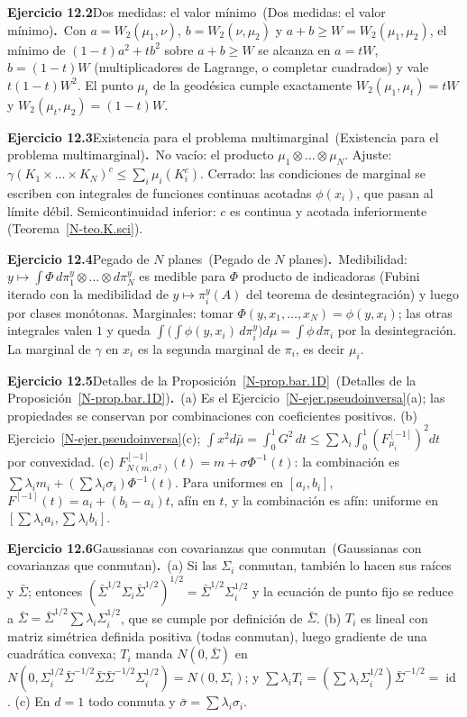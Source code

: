 \documentclass[11pt,a4paper]{amsart}
\newcommand{\id}{\operatorname{id}}
\theoremstyle{remark}
\theoremstyle{definition}
\numberwithin{subsection}{section}
\numberwithin{equation}{section}
\newcommand{\ejlabel}[2]{\par\medskip\noindent\textbf{Ejercicio #1}\ifx\relax#2\relax\else\ (#2)\fi\textbf{.}\ }
\begin{document}
\ejlabel{12.2}{Dos medidas: el valor mínimo}Con $a=W_2(\mu_1,\nu)$, $b=W_2(\nu,\mu_2)$ y $a+b\ge W=W_2(\mu_1,\mu_2)$, el mínimo de $(1-t)a^2+tb^2$ sobre $a+b\ge W$ se alcanza en $a=tW$, $b=(1-t)W$ (multiplicadores de Lagrange, o completar cuadrados) y vale $t(1-t)W^2$. El punto $\mu_t$ de la geodésica cumple exactamente $W_2(\mu_1,\mu_t)=tW$ y $W_2(\mu_t,\mu_2)=(1-t)W$.

\ejlabel{12.3}{Existencia para el problema multimarginal}No vacío: el producto $\mu_1\otimes\dots\otimes\mu_N$. Ajuste: $\gamma(K_1\times\dots\times K_N)^c\le\sum_i\mu_i(K_i^c)$. Cerrado: las condiciones de marginal se escriben con integrales de funciones continuas acotadas $\phi(x_i)$, que pasan al límite débil. Semicontinuidad inferior: $c$ es continua y acotada inferiormente (Teorema~\ref{N-teo.K.sci}).

\ejlabel{12.4}{Pegado de $N$ planes}Medibilidad: $y\mapsto\int\Phi\,d\pi_1^y\otimes\dots\otimes d\pi_N^y$ es medible para $\Phi$ producto de indicadoras (Fubini iterado con la medibilidad de $y\mapsto\pi_i^y(A)$ del teorema de desintegración) y luego por clases monótonas. Marginales: tomar $\Phi(y,x_1,\dots,x_N)=\phi(y,x_i)$; las otras integrales valen $1$ y queda $\int\bigl(\int\phi(y,x_i)\,d\pi_i^y\bigr)d\mu=\int\phi\,d\pi_i$ por la desintegración. La marginal de $\gamma$ en $x_i$ es la segunda marginal de $\pi_i$, es decir $\mu_i$.

\ejlabel{12.5}{Detalles de la Proposición~\ref{N-prop.bar.1D}}(a) Es el Ejercicio~\ref{N-ejer.pseudoinversa}(a); las propiedades se conservan por combinaciones con coeficientes positivos. (b) Ejercicio~\ref{N-ejer.pseudoinversa}(c); $\int x^2d\bar\mu=\int_0^1G^2\,dt\le\sum\lambda_i\int_0^1(F_{\mu_i}^{[-1]})^2dt$ por convexidad. (c) $F^{[-1]}_{N(m,\sigma^2)}(t)=m+\sigma\Phi^{-1}(t)$: la combinación es $\sum\lambda_im_i+(\sum\lambda_i\sigma_i)\Phi^{-1}(t)$. Para uniformes en $[a_i,b_i]$, $F^{[-1]}(t)=a_i+(b_i-a_i)t$, afín en $t$, y la combinación es afín: uniforme en $[\sum\lambda_ia_i,\sum\lambda_ib_i]$.

\ejlabel{12.6}{Gaussianas con covarianzas que conmutan}(a) Si las $\Sigma_i$ conmutan, también lo hacen sus raíces y $\bar\Sigma$; entonces $(\bar\Sigma^{1/2}\Sigma_i\bar\Sigma^{1/2})^{1/2}=\bar\Sigma^{1/2}\Sigma_i^{1/2}$ y la ecuación de punto fijo se reduce a $\bar\Sigma=\bar\Sigma^{1/2}\sum\lambda_i\Sigma_i^{1/2}$, que se cumple por definición de $\bar\Sigma$. (b) $T_i$ es lineal con matriz simétrica definida positiva (todas conmutan), luego gradiente de una cuadrática convexa; $T_i$ manda $N(0,\bar\Sigma)$ en $N(0,\Sigma_i^{1/2}\bar\Sigma^{-1/2}\bar\Sigma\bar\Sigma^{-1/2}\Sigma_i^{1/2})=N(0,\Sigma_i)$; y $\sum\lambda_iT_i=(\sum\lambda_i\Sigma_i^{1/2})\bar\Sigma^{-1/2}=\id$. (c) En $d=1$ todo conmuta y $\bar\sigma=\sum\lambda_i\sigma_i$.
\end{document}

